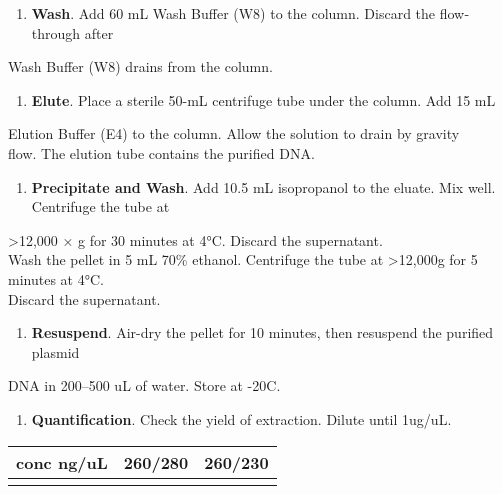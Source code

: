 \documentclass[11pt]{article}
\begin{document}
\begin{enumerate}
\item \textbf{Wash}. Add 60 mL Wash Buffer (W8) to the column. Discard the flow‐through after\\
\end{enumerate}
Wash Buffer (W8) drains from the column.\\

\begin{enumerate}
\item \textbf{Elute}. Place a sterile 50-mL centrifuge tube under the column. Add 15 mL\\
\end{enumerate}
Elution Buffer (E4) to the column. Allow the solution to drain by gravity\\
flow. The elution tube contains the purified DNA.\\

\begin{enumerate}
\item \textbf{Precipitate and Wash}. Add 10.5 mL isopropanol to the eluate. Mix well. Centrifuge the tube at\\
\end{enumerate}
>12,000 × g for 30 minutes at 4°C. Discard the supernatant.\\
Wash the pellet in 5 mL 70\% ethanol. Centrifuge the tube at >12,000g for 5 minutes at 4°C.\\
Discard the supernatant.\\

\begin{enumerate}
\item \textbf{Resuspend}. Air-dry the pellet for 10 minutes, then resuspend the purified plasmid\\
\end{enumerate}
DNA in 200–500 uL of water. Store at -20C.\\

\begin{enumerate}
\item \textbf{Quantification}. Check the yield of extraction. Dilute until 1ug/uL.\\
\end{enumerate}
\begin{center}
\begin{tabular}{lll}
\hline
conc ng/uL & 260/280 & 260/230\\
\hline
 &  & \\
\hline
\end{tabular}
\end{center}
\end{document}
